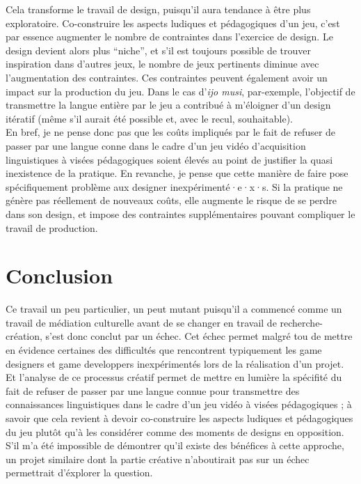 \documentclass{scrartcl}
\begin{document}
	Cela transforme le travail de design, puisqu'il aura tendance à être plus exploratoire. Co-construire les aspects ludiques et pédagogiques d'un jeu, c'est par essence augmenter le nombre de contraintes dans l'exercice de design. Le design devient alors plus “niche”, et s'il est toujours possible de trouver inspiration dans d'autres jeux, le nombre de jeux pertinents diminue avec l'augmentation des contraintes. Ces contraintes peuvent également avoir un impact sur la production du jeu. Dans le cas d'\textit{ijo musi}, par-exemple, l'objectif de transmettre la langue entière par le jeu a contribué à m'éloigner d'un design itératif (même s'il aurait été possible et, avec le recul, souhaitable).\\
	En bref, je ne pense donc pas que les coûts impliqués par le fait de refuser de passer par une langue conne dans le cadre d'un jeu vidéo d'acquisition linguistiques à visées pédagogiques soient élevés au point de justifier la quasi inexistence de la pratique. En revanche, je pense que cette manière de faire pose spécifiquement problème aux designer inexpérimenté·e·x·s. Si la pratique ne génère pas réellement de nouveaux coûts, elle augmente le risque de se perdre dans son design, et impose des contraintes supplémentaires pouvant compliquer le travail de production.
	\section*{Conclusion}
	Ce travail un peu particulier, un peut mutant puisqu'il a commencé comme un travail de médiation culturelle avant de se changer en travail de recherche-création, s'est donc conclut par un échec. Cet échec permet malgré tou de mettre en évidence certaines des difficultés que rencontrent typiquement les game designers et game developpers inexpérimentés lors de la réalisation d'un projet. Et l'analyse de ce processus créatif permet de mettre en lumière la spécifité du fait de refuser de passer par une langue connue pour transmettre des connaissances linguistiques dans le cadre d'un jeu vidéo à visées pédagogiques ; à savoir que cela revient à devoir co-construire les aspects ludiques et pédagogiques du jeu plutôt qu'à les considérer comme des moments de designs en opposition. S'il m'a été impossible de démontrer qu'il existe des bénéfices à cette approche, un projet similaire dont la partie créative n'aboutirait pas sur un échec permettrait d'éxplorer la question.
	
\end{document}
